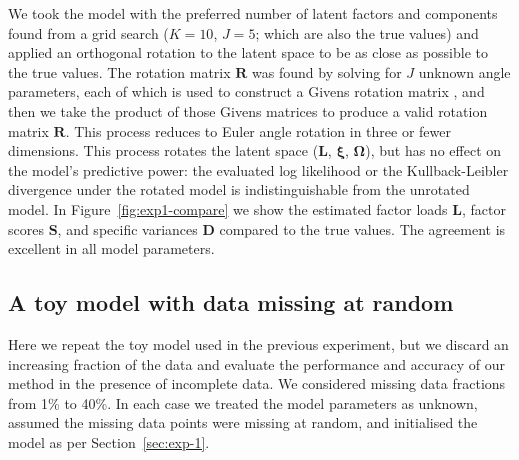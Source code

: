\documentclass[twocolumn]{aastex62}
\newcommand{\vect}[1]{\boldsymbol{\mathbf{#1}}}
\renewcommand{\vec}[1]{\vect{#1}}
\newcommand{\factorloads}{\textbf{L}}
\newcommand{\factorscores}{\textbf{S}}
\newcommand{\specificvariance}{\vec{D}}
\newcommand{\scoremeans}{\vec\xi}
\newcommand{\scorecovs}{\vec\Omega}
\newcommand{\NumLatentFactors}{J}
\newcommand{\NumComponents}{K}
\begin{document}
We took the model with the preferred number of latent factors and components found
from a grid search ($\NumComponents = 10$, $\NumLatentFactors = 5$; which are also
the true values) and applied an orthogonal rotation to the latent space to be as
close as possible to the true values. The rotation matrix $\mathbf{R}$ was found
by solving for $\NumLatentFactors$ unknown angle parameters, each of which is used
to construct a Givens rotation matrix \citep{Givens:1958}, and then we take the product of those Givens
matrices to produce a valid rotation matrix $\vec{R}$. This process reduces to Euler angle rotation in three or fewer dimensions.
This process rotates the latent space
($\factorloads$, $\scoremeans$, $\scorecovs$), but has no effect on the model's 
predictive power: the evaluated log likelihood or the Kullback-Leibler divergence \citep{Kullback:1951} under the
rotated model is indistinguishable from the unrotated model.
In Figure~\ref{fig:exp1-compare} we show the estimated factor loads $\factorloads$,
factor scores $\factorscores$, and specific variances $\specificvariance$ compared
to the true values. The agreement is excellent in all model parameters.


 




\subsection{A toy model with data missing at random}
\label{sec:toy-model-missing-data}

Here we repeat the toy model used in the previous experiment, but we discard an increasing fraction
of the data and evaluate the performance and accuracy of our method in the presence
of incomplete data. We considered missing data fractions from 1\% to
40\%. In each case we treated the model parameters as unknown, assumed
the missing data points were missing at random, and initialised the
model as per Section~\ref{sec:exp-1}.
\end{document}
